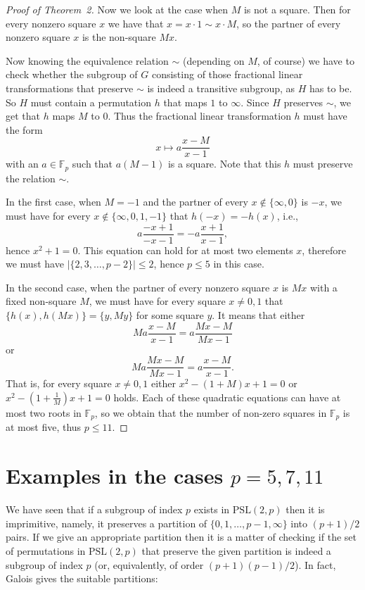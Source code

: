\documentclass[reqno,12pt]{amsart}
\theoremstyle{definition}
\newcommand{\PSL}{\mathrm{PSL}}
\begin{document}
\begin{proof}[Proof of Theorem~2]
Now we look at the case when $M$ is not a square. Then for every nonzero square $x$ we have that
$x=x\cdot 1\sim x\cdot M$, so the partner of every nonzero square $x$ is the non-square $Mx$.

Now knowing the equivalence relation $\sim$ (depending on $M$, of course)
we have to check whether the subgroup of $G$ consisting
of those fractional linear transformations that preserve $\sim$ is indeed a transitive subgroup, as
$H$ has to be. So $H$ must contain a permutation $h$ that maps $1$ to $\infty$. Since $H$ preserves
$\sim$, we get that $h$ maps $M$ to $0$. Thus the fractional linear transformation $h$ must have
the form
\[
x\mapsto a\frac{x-M}{x-1}
\]
with an $a\in\mathbb{F}_p$ such that $a(M-1)$ is a square. Note that this $h$
must preserve the relation $\sim$.

In the first case, when $M=-1$ and the partner of every $x\notin\{\infty,0\}$ is $-x$, we must have for every
$x\notin\{\infty,0,1,-1\}$ that $h(-x)=-h(x)$, i.e.,
\[
a\frac{-x+1}{-x-1}=-a\frac{x+1}{x-1},
\]
hence $x^2+1=0$. This equation can hold for at most two elements $x$,
therefore we must have $|\{2,3,\dots,p-2\}|\le 2$, hence $p\le 5$ in this case.

In the second case, when the partner of every nonzero square $x$ is $Mx$ with a fixed non-square $M$, we
must have for every square $x\ne 0,1$ that $\{h(x),h(Mx)\}=\{y,My\}$ for some square $y$. It means
that either
\[
Ma\frac{x-M}{x-1}=a\frac{Mx-M}{Mx-1}
\]
or
\[
Ma\frac{Mx-M}{Mx-1}=a\frac{x-M}{x-1}.
\]
That is, for every square $x\ne 0,1$ either $x^2-(1+M)x+1=0$ or $x^2-\left(1+\frac{1}{M}\right)x+1=0$
holds. Each of these quadratic equations can have at most two roots in $\mathbb{F}_p$, so we obtain
that the number of non-zero squares in $\mathbb{F}_p$ is at most five, thus $p\le 11$.
\end{proof}

\section{Examples in the cases $p=5, 7, 11$}\label{examples}

We have seen that if a subgroup of index $p$ exists in $\PSL(2,p)$ then it is imprimitive,
namely,
it preserves a partition of $\{0,1,\dots,p-1,\infty\}$ into $(p+1)/2$ pairs. If we give an
appropriate partition then it is a matter of checking if the set of permutations in
$\PSL(2,p)$ that preserve the given partition is indeed a subgroup of index $p$ (or,
equivalently, of order $(p+1)(p-1)/2$). In fact, Galois gives the suitable partitions:
\end{document}
